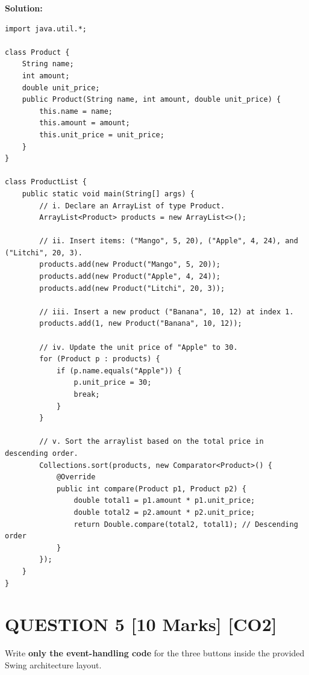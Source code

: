 \documentclass[11pt,a4paper]{article}
\begin{document}
\noindent\textbf{Solution:}
\begin{lstlisting}
import java.util.*;

class Product {
    String name;
    int amount;
    double unit_price;
    public Product(String name, int amount, double unit_price) {
        this.name = name;
        this.amount = amount;
        this.unit_price = unit_price;
    }
}

class ProductList {
    public static void main(String[] args) {
        // i. Declare an ArrayList of type Product.
        ArrayList<Product> products = new ArrayList<>();

        // ii. Insert items: ("Mango", 5, 20), ("Apple", 4, 24), and ("Litchi", 20, 3).
        products.add(new Product("Mango", 5, 20));
        products.add(new Product("Apple", 4, 24));
        products.add(new Product("Litchi", 20, 3));

        // iii. Insert a new product ("Banana", 10, 12) at index 1.
        products.add(1, new Product("Banana", 10, 12));

        // iv. Update the unit price of "Apple" to 30.
        for (Product p : products) {
            if (p.name.equals("Apple")) {
                p.unit_price = 30;
                break;
            }
        }

        // v. Sort the arraylist based on the total price in descending order.
        Collections.sort(products, new Comparator<Product>() {
            @Override
            public int compare(Product p1, Product p2) {
                double total1 = p1.amount * p1.unit_price;
                double total2 = p2.amount * p2.unit_price;
                return Double.compare(total2, total1); // Descending order
            }
        });
    }
}
\end{lstlisting}
\newpage

\section*{QUESTION 5 \hfill [10 Marks] [CO2]}
Write \textbf{only the event-handling code} for the three buttons inside the provided Swing architecture layout.
\end{document}
